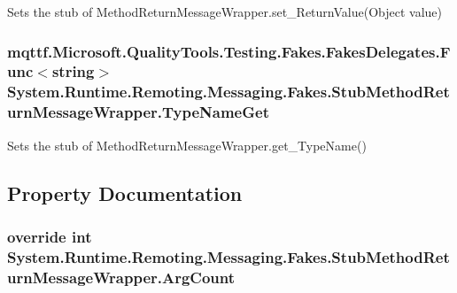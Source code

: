 Sets the stub of Method\-Return\-Message\-Wrapper.\-set\-\_\-\-Return\-Value(\-Object value)

\hypertarget{class_system_1_1_runtime_1_1_remoting_1_1_messaging_1_1_fakes_1_1_stub_method_return_message_wrapper_ad4c8584dcc279c2a674681bdc723632c}{
\subsubsection[{Type\-Name\-Get}]{\setlength{\rightskip}{0pt plus 5cm}mqttf.\-Microsoft.\-Quality\-Tools.\-Testing.\-Fakes.\-Fakes\-Delegates.\-Func$<$string$>$ System.\-Runtime.\-Remoting.\-Messaging.\-Fakes.\-Stub\-Method\-Return\-Message\-Wrapper.\-Type\-Name\-Get}}\label{class_system_1_1_runtime_1_1_remoting_1_1_messaging_1_1_fakes_1_1_stub_method_return_message_wrapper_ad4c8584dcc279c2a674681bdc723632c}


Sets the stub of Method\-Return\-Message\-Wrapper.\-get\-\_\-\-Type\-Name()



\subsection{Property Documentation}
\hypertarget{class_system_1_1_runtime_1_1_remoting_1_1_messaging_1_1_fakes_1_1_stub_method_return_message_wrapper_a4da5c3eeb47929c277af491708a71627}{
\subsubsection[{Arg\-Count}]{\setlength{\rightskip}{0pt plus 5cm}override int System.\-Runtime.\-Remoting.\-Messaging.\-Fakes.\-Stub\-Method\-Return\-Message\-Wrapper.\-Arg\-Count\hspace{0.3cm}{\ttfamily [get]}}}\label{class_system_1_1_runtime_1_1_remoting_1_1_messaging_1_1_fakes_1_1_stub_method_return_message_wrapper_a4da5c3eeb47929c277af491708a71627}


